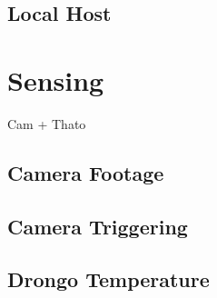 \documentclass[class=report,11pt,crop=false]{standalone}
\begin{document}
\subsection{Local Host}

\section{Sensing}
Cam + Thato

\subsection{Camera Footage}

\subsection{Camera Triggering}

\subsection{Drongo Temperature}
\cite{McCafferty2015}


\ifstandalone

\printnoidxglossary[type=\acronymtype,nonumberlist]
\fi
\end{document}
